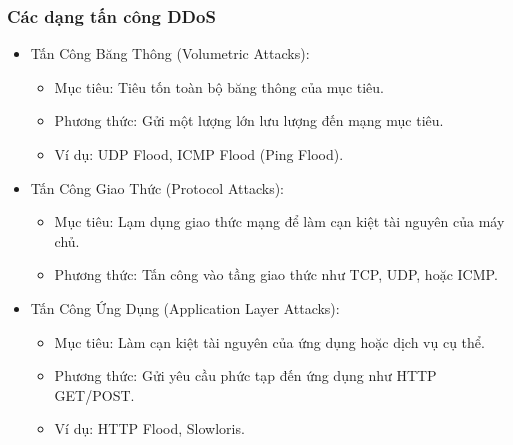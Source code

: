 \documentclass[13pt]{article}
\begin{document}
                \subsubsection{Các dạng tấn công DDoS  }
                \begin{itemize}
                \item Tấn Công Băng Thông (Volumetric Attacks):
                    \begin{itemize}
                        \item Mục tiêu: Tiêu tốn toàn bộ băng thông của mục tiêu.
                        \item Phương thức: Gửi một lượng lớn lưu lượng đến mạng mục tiêu.
                        \item Ví dụ: UDP Flood, ICMP Flood (Ping Flood).
                    \end{itemize}

                \item Tấn Công Giao Thức (Protocol Attacks):
                    \begin{itemize}
                        \item Mục tiêu: Lạm dụng giao thức mạng để làm cạn kiệt tài nguyên của máy chủ.
                        \item Phương thức: Tấn công vào tầng giao thức như TCP, UDP, hoặc ICMP.
                    \end{itemize}

                \item Tấn Công Ứng Dụng (Application Layer Attacks):
                    \begin{itemize}
                        \item Mục tiêu: Làm cạn kiệt tài nguyên của ứng dụng hoặc dịch vụ cụ thể.
                        \item Phương thức: Gửi yêu cầu phức tạp đến ứng dụng như HTTP GET/POST.
                        \item Ví dụ: HTTP Flood, Slowloris.
                    \end{itemize}
                
                \end{itemize}
            
\end{document}
